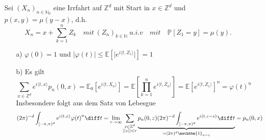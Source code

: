 Sei $(X_{n})_{n \in \mathbb{N}_{0}}$ eine Irrfahrt auf $\mathbb{Z}^{d}$ mit Start in $x \in \mathbb{Z}^{d}$ und $p(x,y) = \mu(y-x)$, d.h.
\begin{equation*}
X_{n} = x + \sum_{k=1}^{n} Z_{k} \quad mit \: (Z_{n})_{k \in \mathbb{N}} \: u.i.v\quad mit \quad \mathbb{P}[Z_{1} = y] = \mu(y).
\end{equation*}
\begin{itemize}
\item[a)]  $\varphi(0) = 1$ und $\vert \varphi(t) \vert \leq \mathbb{E}[\vert e^{i \langle t, Z_{1} \rangle} \vert] = 1 $
\item[b)] Es gilt
\begin{equation*}
\sum_{x \in \mathbb{Z}^{d}} e^{i \langle t, x \rangle} p_{n}(0,x) = \mathbb{E}_{0}[e^{i \langle t, X_{n} \rangle} ] = \mathbb{E}[\prod_{k=1}^{n} e^{i \langle t, Z_{k} \rangle}] = \mathbb{E}[e^{i \langle t, Z_{1} \rangle}]^{n} = {\varphi (t)}^{n}
\end{equation*}
Insbesondere folgt aus dem Satz von Lebesgue
\begin{equation*}
(2 \pi)^{-d} \int_{[-\pi, \pi)^{d}} e^{i \langle t, x \rangle} {\varphi (t)}^{n} \diff t = \lim_{r \to \infty} \sum_{\substack{{z \in \mathbb{Z}^{d}} \\ {\vert \vert z \vert \vert < r}}} \underbrace{ p_{n}(0,z) (2 \pi)^{-d} \int_{[-\pi, \pi)^{d}} e^{i \langle t, z- x \rangle} \diff t }_{= (2\pi)^{d} \mathbbm{1}_{x=
z}} = p_{n}(0,x)
\end{equation*}
\end{itemize}